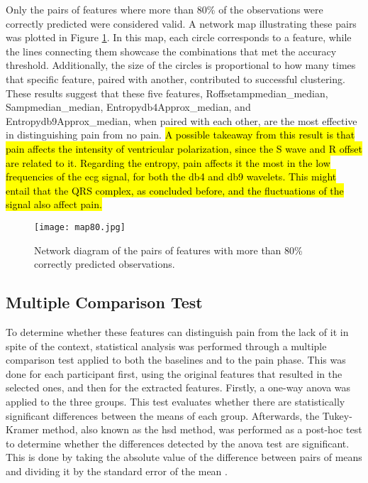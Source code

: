 \pagebreak
Only the pairs of features where more than 80\% of the observations were correctly predicted were considered valid. A network map illustrating these pairs was plotted in Figure \ref{fig:map80}. In this map, each circle corresponds to a feature, while the lines connecting them showcase the combinations that met the accuracy threshold. Additionally, the size of the circles is proportional to how many times that specific feature, paired with another, contributed to successful clustering. These results suggest that these five features, Roffsetampmedian\_median, Sampmedian\_median, Entropydb4Approx\_median, and Entropydb9Approx\_median, when paired with each other, are the most effective in distinguishing pain from no pain. \hl{A possible takeaway from this result is that pain affects the intensity of ventricular polarization, since the S wave and R offset are related to it. Regarding the entropy, pain affects it the most in the low frequencies of the \ac{ecg} signal, for both the db4 and db9 wavelets. This might entail that the QRS complex, as concluded before, and the fluctuations of the signal also affect pain.}





\begin{figure}[h!]
    \centering
    \texttt{[image: map80.jpg]}
    \caption{Network diagram of the pairs of features with more than 80\% correctly predicted observations.}
    \label{fig:map80}
\end{figure}



\subsection{Multiple Comparison Test}

To determine whether these features can distinguish pain from the lack of it in spite of the context, statistical analysis was performed through a multiple comparison test applied to both the baselines and to the pain phase. This was done for each participant first, using the original features that resulted in the selected ones, and then for the extracted features. Firstly, a one-way \ac{anova} was applied to the three groups. This test evaluates whether there are statistically significant differences between the means of each group. Afterwards, the Tukey-Kramer method, also known as the \ac{hsd} method, was performed as a post-hoc test to determine whether the differences detected by the \ac{anova} test are significant. This is done by taking the absolute value of the difference between pairs of means and dividing it by the standard error of the mean \cite{Nanda2021}. %



